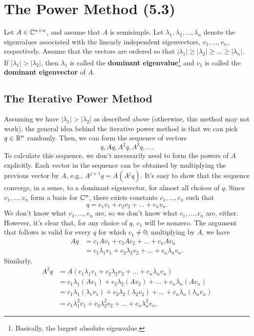 \documentclass[letterpaper]{article}
\newcommand{\0}{\mathbf{0}}
\begin{document}
\section{The Power Method (5.3)}
Let $A \in \mathbb{C}^{n \times n}$, and assume that $A$ is semisimple. Let $\lambda_1, \lambda_2, \hdots, \lambda_n$ denote the eigenvalues associated with the linearly independent eigenvectors, $v_1, \hdots, v_n$, respectively. Assume that the vectors are ordered so that $|\lambda_1| \geq |\lambda_2| \geq \hdots \geq |\lambda_n|$. If $|\lambda_1| > |\lambda_2|$, then $\lambda_1$ is called the \textbf{dominant eigenvalue}\footnote{Basically, the largest absolute eigenvalue.} and $v_1$ is called the \textbf{dominant eigenvector} of $A$.  

\subsection{The Iterative Power Method}
Assuming we have $|\lambda_1| > |\lambda_2|$ as described above (otherwise, this method may not work), the general idea behind the iterative power method is that we can pick $q \in \mathbb{R}^n$ randomly. Then, we can form the sequence of vectors
\[q, Aq, A^2 q, A^3 q, \hdots.\]
To calculate this sequence, we don't necessarily need to form the powers of $A$ explicitly. Each vector in the sequence can be obtained by multiplying the previous vector by $A$, e.g., $A^{j + 1}q = A(A^j q)$. It's easy to show that the sequence converge, in a sense, to a dominant eigenvector, for almost all choices of $q$. Since $v_1, \hdots, v_n$ form a basis for $\mathbb{C}^n$, there exists constants $c_1, \hdots, c_n$ such that  
\[q = c_1 v_1 + c_2 v_2 + \hdots + c_n v_n.\]
We don't know what $v_1, \hdots, v_n$ are, so we don't know what $c_1, \hdots, c_n$ are, either. However, it's clear that, for any choice of $q$, $c_1$ will be nonzero. The argument that follows is valid for every $q$ for which $c_1 \neq 0$; multiplying by $A$, we have 
\begin{equation*}
    \begin{aligned}
        Aq &= c_1 Av_1 + c_2 Ac_2 + \hdots + c_n Av_n \\ 
            &= c_1 \lambda_1 v_1 + c_2 \lambda_2 v_2 + \hdots + c_n  \lambda_n v_n.
    \end{aligned}
\end{equation*}
Similarly, 
\begin{equation*}
    \begin{aligned}
        A^2 q &= A(c_1 \lambda_1 v_1 + c_2 \lambda_2 v_2 + \hdots + c_n  \lambda_n v_n) \\
            &= c_1 \lambda_1 (Av_1) + c_2 \lambda_2 (Av_2) + \hdots + c_n \lambda_n (Av_n) \\ 
            &= c_1 \lambda_1 (\lambda_1 v_1) + c_2 \lambda_2 (\lambda_2 v_2) + \hdots + c_n \lambda_n (\lambda_n v_n) \\ 
            &= c_1 \lambda_1^2 v_1 + c_2 \lambda_2^2 v_2 + \hdots + c_n \lambda_n^2 v_n.
    \end{aligned}
\end{equation*}
\end{document}
